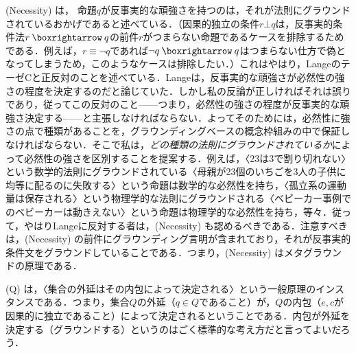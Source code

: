 \documentclass[dvipdfmx,twoside,11pt,uplatex]{jsarticle}
\theoremstyle{definition}
\begin{document}
(Necessity) は，%
命題$q$が反事実的な頑強さを持つのは，それが法則にグラウンドされているおかげであると述べている．（因果的独立の条件$r\bot q$は，反事実的条件法$r\necif q$の前件$r$がつまらない命題であるケースを排除するためである．例えば，$r\equiv \lnot q$であれば$\lnot q\necif q$はつまらない仕方で偽となってしまうため，このようなケースは排除したい．）これはやはり，LangeのテーゼCと正反対のことを述べている．Langeは，反事実的な頑強さが必然性の強さの程度を決定するのだと論じていた．しかし私の反論が正しければそれは誤りであり，従ってこの反対のこと------つまり，必然性の強さの程度が反事実的な頑強さ決定する------と主張しなければならない．よってそのためには，必然性に強さの点で種類があることを，グラウンディングベースの概念枠組みの中で保証しなければならない．そこで私は，\emph{どの種類の法則にグラウンドされているか}によって必然性の強さを区別することを提案する．例えば，〈23は3で割り切れない〉という数学的法則にグラウンドされている〈母親が23個のいちごを3人の子供に均等に配るのに失敗する〉という命題は数学的な必然性を持ち，〈孤立系の運動量は保存される〉という物理学的な法則にグラウンドされる〈ベビーカー事例でのベビーカーは動きえない〉という命題は物理学的な必然性を持ち，等々．従って，やはりLangeに反対する者は，(Necessity) も認めるべきである．注意すべきは，(Necessity) の前件にグラウンディング言明が含まれており，それが反事実的条件文をグラウンドしていることである．つまり，(Necessity) はメタグラウンドの原理である．

(Q) は，〈集合の外延はその内包によって決定される〉という一般原理のインスタンスである．つまり，集合$Q$の外延（$q\in Q$であること）が，$Q$の内包（$e, c$が因果的に独立であること）によって決定されるということである．内包が外延を決定する（グラウンドする）というのはごく標準的な考え方だと言ってよいだろう．
\end{document}
